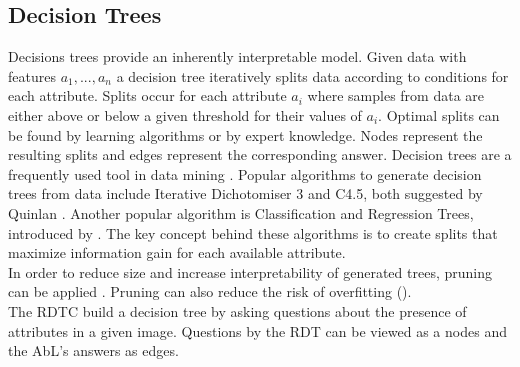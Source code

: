 \documentclass[a4paper,cleardoubleempty,BCOR1cm, 11pt]{report}
\begin{document}
\subsection{Decision Trees}
Decisions trees provide an inherently interpretable model. Given data with features $a_1, ..., a_n$ a decision tree iteratively splits data according to conditions for each attribute. Splits occur for each attribute $a_i$ where samples from data are either above or below a given threshold for their values of $a_i$. Optimal splits can be found by learning algorithms or by expert knowledge. Nodes represent the resulting splits and edges represent the corresponding answer.
Decision trees are a frequently used tool in data mining \cite{wu2008top}. Popular algorithms to generate decision trees from data include Iterative Dichotomiser 3 and C4.5, both suggested by Quinlan \cite{quinlan1986induction,quinlan2014c4}.
Another popular algorithm is Classification and Regression Trees, introduced by \citet{breiman1984classification}. The key concept behind these algorithms is to create splits that maximize information gain for each available attribute.\\
In order to reduce size and increase interpretability of generated trees, pruning can be applied \cite{mingers1989empirical}. Pruning can also reduce the risk of overfitting (\cite{kearns1998fast}).\\
The RDTC build a decision tree by asking questions about the presence of attributes in a given image. Questions by the RDT can be viewed as a nodes and the AbL's answers as edges.
\end{document}
